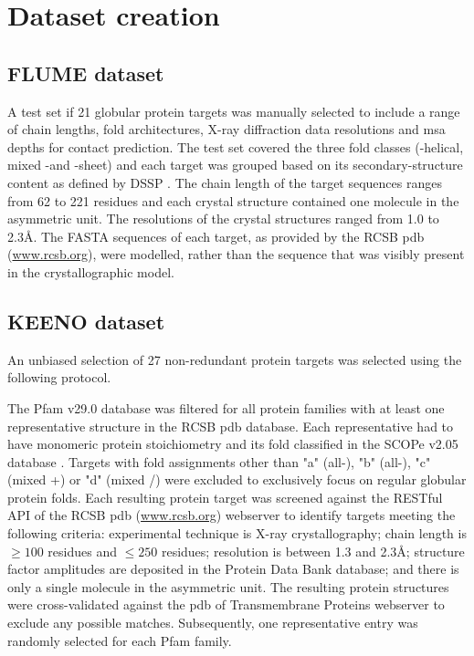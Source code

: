 
\section{Dataset creation}

\subsection{FLUME dataset}
A test set if 21 globular protein targets was manually selected to include a range of chain lengths, fold architectures, X-ray diffraction data resolutions and \gls{msa} depths for contact prediction. The test set covered the three fold classes (\textalpha-helical, mixed \textalpha-\textbeta and \textbeta-sheet) and each target was grouped based on its secondary-structure content as defined by DSSP \cite{Kabsch1983-dy}. The chain length of the target sequences ranges from 62 to 221 residues and each crystal structure contained one molecule in the asymmetric unit. The resolutions of the crystal structures ranged from 1.0 to 2.3\AA. The FASTA sequences of each target, as provided by the RCSB \gls{pdb} (\url{www.rcsb.org}), were modelled, rather than the sequence that was visibly present in the crystallographic model. 

\subsection{KEENO dataset} \label{sec:methods_keeno_dataset}
An unbiased selection of 27 non-redundant protein targets was selected using the following protocol.

The Pfam v29.0 \cite{Finn2016-tz} database was filtered for all protein families with at least one representative structure in the RCSB \gls{pdb} \cite{Berman2000-qj} database. Each representative had to have monomeric protein stoichiometry and its fold classified in the SCOPe v2.05 database \cite{Chandonia2017-bd}. Targets with fold assignments other than "a" (all-\textalpha), "b" (all-\textbeta), "c" (mixed \textalpha+\textbeta) or "d" (mixed \textalpha/\textbeta) were excluded to exclusively focus on regular globular protein folds. Each resulting protein target was screened against the RESTful API of the RCSB \gls{pdb} (\url{www.rcsb.org}) webserver to identify targets meeting the following criteria: experimental technique is X-ray crystallography; chain length is $\geq100$ residues and $\leq250$ residues; resolution is between 1.3 and 2.3\AA; structure factor amplitudes are deposited in the Protein Data Bank \cite{Berman2000-qj} database; and there is only a single molecule in the asymmetric unit. The resulting protein structures were cross-validated against the \acrlong{pdb} of Transmembrane Proteins \cite{Tusnady2005-lp} webserver to exclude any possible matches. Subsequently, one representative entry was randomly selected for each Pfam family.

